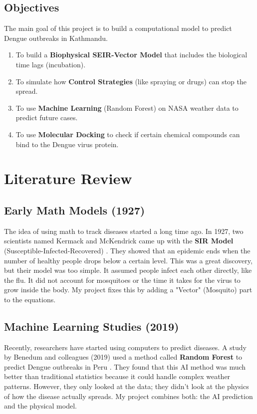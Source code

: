 \documentclass[12pt, a4paper]{article}
\begin{document}
\subsection{Objectives}
The main goal of this project is to build a computational model to predict Dengue outbreaks in Kathmandu.
\begin{enumerate}
    \item To build a \textbf{Biophysical SEIR-Vector Model} that includes the biological time lags (incubation).
    \item To simulate how \textbf{Control Strategies} (like spraying or drugs) can stop the spread.
    \item To use \textbf{Machine Learning} (Random Forest) on NASA weather data to predict future cases.
    \item To use \textbf{Molecular Docking} to check if certain chemical compounds can bind to the Dengue virus protein.
\end{enumerate}

\newpage

\section{Literature Review}

\subsection{Early Math Models (1927)}
The idea of using math to track diseases started a long time ago. In 1927, two scientists named Kermack and McKendrick came up with the \textbf{SIR Model} (Susceptible-Infected-Recovered) \cite{ref2}. They showed that an epidemic ends when the number of healthy people drops below a certain level. This was a great discovery, but their model was too simple. It assumed people infect each other directly, like the flu. It did not account for mosquitoes or the time it takes for the virus to grow inside the body. My project fixes this by adding a "Vector" (Mosquito) part to the equations.

\subsection{Machine Learning Studies (2019)}
Recently, researchers have started using computers to predict diseases. A study by Benedum and colleagues (2019) used a method called \textbf{Random Forest} to predict Dengue outbreaks in Peru \cite{ref5}. They found that this AI method was much better than traditional statistics because it could handle complex weather patterns. However, they only looked at the data; they didn't look at the physics of how the disease actually spreads. My project combines both: the AI prediction and the physical model.
\end{document}
